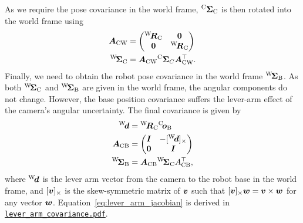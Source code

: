 \documentclass{article}
\begin{document}
As we require the pose covariance in the world frame, ${}^{\mathrm{C}} \bm{\Sigma}_{\mathrm{C}}$ is then rotated into the world frame using
\begin{align}
\bm{A}_\mathrm{CW} &= \begin{pmatrix}{}^{\mathrm{W}}\! \bm{R}_{\mathrm{C}} & \bm{0} \\ \bm{0} & {}^{\mathrm{W}}\! \bm{R}_{\mathrm{C}}\end{pmatrix} \\
{}^{\mathrm{W}}\! \bm{\Sigma}_{\mathrm{C}} &= \bm{A}_\mathrm{CW} {}^{\mathrm{C}} \bm{\Sigma}_C \bm{A}_\mathrm{CW}^\top.
\end{align}
Finally, we need to obtain the robot pose covariance in the world frame ${}^{\mathrm{W}}\! \bm{\Sigma}_{\mathrm{B}}$. As both ${}^{\mathrm{W}}\! \bm{\Sigma}_{\mathrm{C}}$ and ${}^{\mathrm{W}}\! \bm{\Sigma}_{\mathrm{B}}$ are given in the world frame, the angular components do not change. However, the base position covariance suffers the lever-arm effect of the camera's angular uncertainty. The final covariance is given by
\begin{align}
{}^{\mathrm{W}}\! \bm{d} &= {}^{\mathrm{W}}\! \bm{R}_{\mathrm{C}} {}^{\mathrm{C}}\! \bm{o}_{\mathrm{B}} \\
\bm{A}_\mathrm{CB} &= \begin{pmatrix} \bm{I} & -[{}^{\mathrm{W}}\! \bm{d}]_\times \\ \bm{0} & \bm{I} \end{pmatrix} \label{eq:lever_arm_jacobian}\\
{}^{\mathrm{W}}\! \bm{\Sigma}_{\mathrm{B}} &= \bm{A}_\mathrm{CB} {}^{\mathrm{W}}\! \bm{\Sigma}_{\mathrm{C}} A_\mathrm{CB}^\top,
\end{align}
where ${}^{\mathrm{W}}\! \bm{d}$ is the lever arm vector from the camera to the robot base in the world frame, and $[\bm{v}]_\times$ is the skew-symmetric matrix of $\bm{v}$ such that $[\bm{v}]_\times \bm{w} = \bm{v} \times \bm{w}$ for any vector $\bm{w}$.
Equation~\eqref{eq:lever_arm_jacobian} is derived in \href{lever_arm_covariance.pdf}{\texttt{lever\_arm\_covariance.pdf}}.
\end{document}
